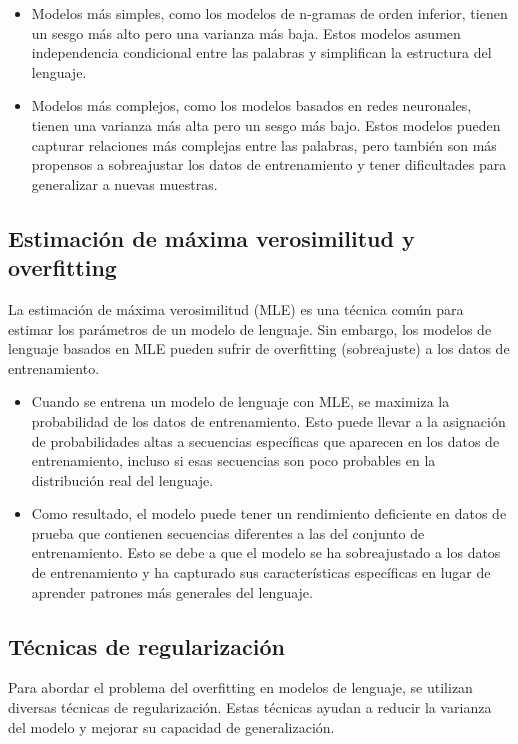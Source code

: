 \begin{itemize}
    \item Modelos más simples, como los modelos de n-gramas de orden inferior, tienen un sesgo más alto pero una varianza más baja. Estos modelos asumen independencia condicional entre las palabras y simplifican la estructura del lenguaje.
    
    \item Modelos más complejos, como los modelos basados en redes neuronales, tienen una varianza más alta pero un sesgo más bajo. Estos modelos pueden capturar relaciones más complejas entre las palabras, pero también son más propensos a sobreajustar los datos de entrenamiento y tener dificultades para generalizar a nuevas muestras.
\end{itemize}

\subsection{Estimación de máxima verosimilitud y overfitting}

La estimación de máxima verosimilitud (MLE) es una técnica común para estimar los parámetros de un modelo de lenguaje. Sin embargo, los modelos de lenguaje basados en MLE pueden sufrir de overfitting (sobreajuste) a los datos de entrenamiento.

\begin{itemize}
    \item Cuando se entrena un modelo de lenguaje con MLE, se maximiza la probabilidad de los datos de entrenamiento. Esto puede llevar a la asignación de probabilidades altas a secuencias específicas que aparecen en los datos de entrenamiento, incluso si esas secuencias son poco probables en la distribución real del lenguaje.
    
    \item Como resultado, el modelo puede tener un rendimiento deficiente en datos de prueba que contienen secuencias diferentes a las del conjunto de entrenamiento. Esto se debe a que el modelo se ha sobreajustado a los datos de entrenamiento y ha capturado sus características específicas en lugar de aprender patrones más generales del lenguaje.
\end{itemize}

\subsection{Técnicas de regularización}

Para abordar el problema del overfitting en modelos de lenguaje, se utilizan diversas técnicas de regularización. Estas técnicas ayudan a reducir la varianza del modelo y mejorar su capacidad de generalización.

